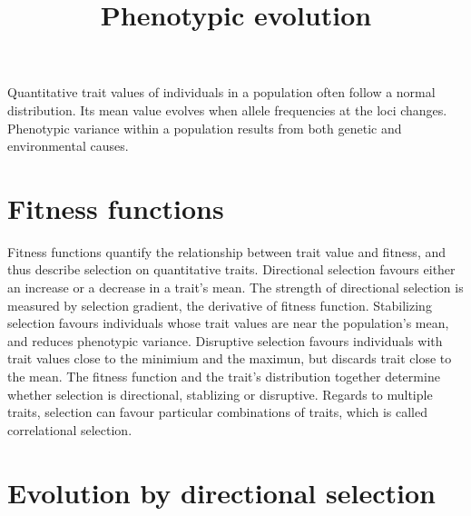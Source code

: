 \documentclass[11pt]{article}
\title{Phenotypic evolution}
\author{}
\date{}
\begin{document}
\begin{sloppypar}
  \maketitle

  \linenumbers
Quantitative trait values of individuals in a population often follow a normal distribution. 
Its mean value evolves when allele frequencies at the loci changes. 
Phenotypic variance within a population results from both genetic and environmental causes. 

\section{Fitness functions}
Fitness functions quantify the relationship between trait value and fitness, and thus describe selection on quantitative traits. 
Directional selection favours either an increase or a decrease in a trait's mean. 
The strength of directional selection is measured by selection gradient, the derivative of fitness function. 
Stabilizing selection favours individuals whose trait values are near the population's mean, and reduces phenotypic variance. 
Disruptive selection favours individuals with trait values close to the minimium and the maximun, but discards trait close to the mean. 
The fitness function and the trait's distribution together determine whether selection is directional, stablizing or disruptive. 
Regards to multiple traits, selection can favour particular combinations of traits, which is called correlational selection. 

\section{Evolution by directional selection}

  
\end{sloppypar}
\end{document}
